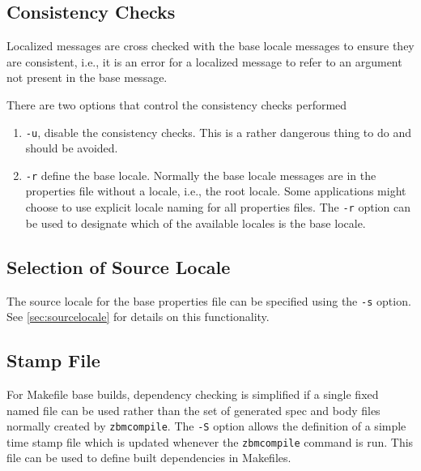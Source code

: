 \subsection{Consistency Checks}

Localized messages are cross checked with the base locale messages to ensure
they are consistent, i.e., it is an error for a localized message to refer
to an argument not present in the base message.

There are two options that control the consistency checks performed
\begin{enumerate}
\item \verb|-u|, disable the consistency checks.  This is a rather dangerous
      thing to do and should be avoided.
\item \verb|-r| define the base locale.  Normally the base locale messages
      are in the properties file without a locale, i.e., the root locale.
      Some applications might choose to use explicit locale naming for all
      properties files.  The \verb|-r| option can be used to designate which
      of the available locales is the base locale.
\end{enumerate}

\subsection{Selection of Source Locale}

The source locale for the base properties file can be specified using the
\verb|-s| option.  See \ref{sec:sourcelocale} for details on this functionality.

\subsection{Stamp File}

For Makefile base builds, dependency checking is simplified if a single fixed
named file can be used rather than the set of generated spec and body files
normally created by \verb|zbmcompile|.  The \verb|-S| option allows the
definition of a simple time stamp file which is updated whenever the
\verb|zbmcompile| command is run.  This file can be used to define built
dependencies in Makefiles.
